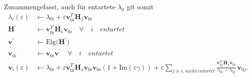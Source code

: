 Zusammengefasst, auch für entartete $\lambda_0$ git somit
\begin{align*}
    \lambda_i(\varepsilon)
    & \gets
    \lambda_{0i} + \varepsilon \bm v_{0i}^T \bm H_1 \bm v_{0i}\\
    \bm H^\prime & \gets \bm v_{0i}^T \bm H_1 \bm v_{0i} \quad \forall \quad i \quad entartet \\
    \bm v^\prime & \gets \mathrm{Eig} \Big( \bm H^\prime \Big) \\
    \bm v_{0i} & \gets \bm v_{0i} \bm v^\prime  \quad \forall \quad i \quad entartet \\
    \bm v_i(\varepsilon)
    & \gets
    \lambda_{0i} + \varepsilon \bm v_{0i}^T \bm H_1 \bm v_{0i}
        \bm v_{0i} ( 1 + \mathrm{Im}(\varepsilon \gamma) ) + \varepsilon \sum_{j \neq i, \,nicht\,entartet}
        \frac{\bm v_{0j}^T \bm H_1 \bm v_{0i}}{\lambda_{0i} - \lambda_{0j}}
        \, \bm v_{0j}.
\end{align*}